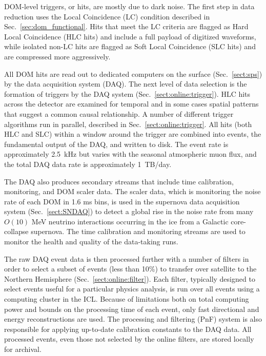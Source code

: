 DOM-level triggers, or hits, are mostly due to dark noise. The first
step in data reduction uses the Local Coincidence (LC) condition
described in Sec.~\ref{sec:dom_functional}.  Hits that meet the LC criteria are flagged as Hard Local Coincidence (HLC hits) and
include a full payload of digitized waveforms, while isolated non-LC
hits are flagged as Soft Local Coincidence (SLC hits) and are
compressed more aggressively. 

All DOM hits are read out to dedicated computers on the surface (Sec.~\ref{sect:sps}) by the data
acquisition system (DAQ).  The next level of data selection is the
formation of triggers by the DAQ system (Sec.~\ref{sect:online:trigger}). HLC hits across the
detector are examined for temporal and in some cases spatial patterns that
suggest a common causal relationship.  A number of different trigger
algorithms run in parallel, described in Sec.~\ref{sect:online:trigger}.  All hits
(both HLC and SLC) within a window around the trigger are
combined into events, the fundamental output of the DAQ, and written
to disk.  The event rate is approximately 2.5~kHz but varies with the
seasonal atmospheric muon flux, and the total DAQ data rate is approximately
1~TB/day.

The DAQ also produces secondary streams that include time
calibration, monitoring, and DOM scaler data.  The scaler data, which is
monitoring the noise rate of each DOM in 1.6 ms bins, is used in the
supernova data acquisition system (Sec.~\ref{sect:SNDAQ}) to detect a
global rise in the noise rate from
many $O(10)$ MeV neutrino interactions occurring in the ice from a
Galactic core-collapse supernova.  The time calibration and monitoring
streams are used to monitor the health and quality of the data-taking runs.

The raw DAQ event data is then processed further with a number of
filters in order to select a subset of events (less than 10\%) to
transfer over satellite to the Northern Hemisphere (Sec.~\ref{sect:online:filter}).  Each
filter, typically designed to select events useful for a particular physics
analysis, is run
over all events using a computing cluster in the ICL.  Because of
limitations both on total computing power and bounds on the processing time
of each event, only fast directional and energy reconstructions are used.
The processing and filtering (PnF) system is also responsible for applying
up-to-date calibration constants to the DAQ data. All processed events, even those not
selected by the online filters, are stored locally for archival.

